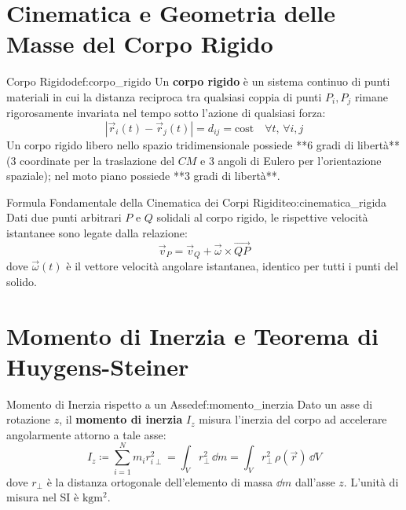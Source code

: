 \vspace{0.5em}

\section{Cinematica e Geometria delle Masse del Corpo Rigido}
\label{sec:cinematica_rigida}

\begin{definizione}{Corpo Rigido}{def:corpo_rigido}
Un \textbf{corpo rigido} è un sistema continuo di punti materiali in cui la distanza reciproca tra qualsiasi coppia di punti $P_i, P_j$ rimane rigorosamente invariata nel tempo sotto l'azione di qualsiasi forza:
\begin{equation}
    |\vec{r}_i(t) - \vec{r}_j(t)| = d_{ij} = \text{cost} \quad \forall t, \, \forall i, j
\end{equation}
Un corpo rigido libero nello spazio tridimensionale possiede **6 gradi di libertà** (3 coordinate per la traslazione del $CM$ e 3 angoli di Eulero per l'orientazione spaziale); nel moto piano possiede **3 gradi di libertà**.
\end{definizione}

\begin{teorema}{Formula Fondamentale della Cinematica dei Corpi Rigidi}{teo:cinematica_rigida}
Dati due punti arbitrari $P$ e $Q$ solidali al corpo rigido, le rispettive velocità istantanee sono legate dalla relazione:
\begin{equation}
    \vec{v}_P = \vec{v}_Q + \vec{\omega} \times \vec{QP}
    \label{eq:formula_corpo_rigido}
\end{equation}
dove $\vec{\omega}(t)$ è il vettore velocità angolare istantanea, identico per tutti i punti del solido.
\end{teorema}

\section{Momento di Inerzia e Teorema di Huygens-Steiner}
\label{sec:momento_inerzia}

\begin{definizione}{Momento di Inerzia rispetto a un Asse}{def:momento_inerzia}
Dato un asse di rotazione $z$, il \textbf{momento di inerzia} $I_z$ misura l'inerzia del corpo ad accelerare angolarmente attorno a tale asse:
\begin{equation}
    I_z \coloneqq \sum_{i=1}^N m_i r_{i\perp}^2 = \int_V r_\perp^2\,\dd m = \int_V r_\perp^2\,\rho(\vec{r})\,\dd V
    \label{eq:momento_inerzia_def}
\end{equation}
dove $r_\perp$ è la distanza ortogonale dell'elemento di massa $\dd m$ dall'asse $z$. L'unità di misura nel SI è $\si{\kilogram\metre\squared}$.
\end{definizione}

